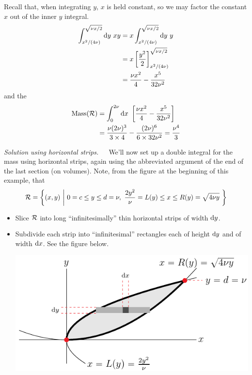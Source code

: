 \begin{eg}[Mass]
\begin{itemize}
Recall that, when integrating $y$, $x$ is held constant, so we may factor the
constant $x$ out of the inner $y$ integral.
\begin{align*}
\int_{x^2/(4\nu)}^{\sqrt{\nu x/2}} \mathrm{d}y\ xy
&= x\int_{x^2/(4\nu)}^{\sqrt{\nu x/2}} \mathrm{d}y\ y \\
&= x\left[\frac{y^2}{2}\right]_{x^2/(4\nu)}^{\sqrt{\nu x/2}} \\
&=\frac{\nu x^2}{4}-\frac{x^5}{32\nu^2}
\end{align*}
and the 
\begin{align*}
\text{Mass}(\cR)
        &=\int_0^{2\nu} \dee{x}\ 
             \left[\frac{\nu x^2}{4}-\frac{x^5}{32\nu^2}\right] \\
        &= \frac{\nu (2\nu)^3}{3\times 4}-\frac{(2\nu)^6}{6\times 32\nu^2}
         =\frac{\nu^4}{3}
\end{align*}
\end{itemize}


\medskip\noindent\emph{Solution using horizontal strips.}\ \ \
We'll now set up a double integral for the mass using horizontal strips,
again using the abbreviated argument of the end of the last section 
(on volumes).  Note, from the figure at the beginning of this example, that
\begin{equation*}
\cR=\bigg\{(x,y)\ \bigg|\ 0=c\le y\le d=\nu,\ 
       \frac{2 y^2}{\nu} = L(y)\le x\le R(y) = \sqrt{4\nu y} \ \bigg\}
\end{equation*}
\begin{itemize}
\item
   Slice $\mathcal{R}$ into long ``infinitesimally'' thin 
   horizontal strips of width $\mathrm{d}y$.
\item
   Subdivide each strip into ``infinitesimal'' rectangles each of 
   height $\mathrm{d}y$ and of width $\mathrm{d}x$. See the figure below.
\begin{efig}
\begin{center}
   \includegraphics{dblIntAc.pdf}
\end{center}
\end{efig}


\end{itemize}
\end{eg}
